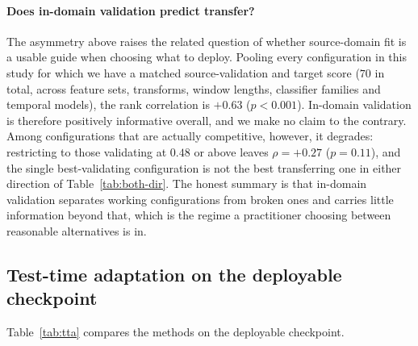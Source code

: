\documentclass[a4paper,fleqn]{cas-dc}
\begin{document}
\paragraph{Does in-domain validation predict transfer?} The asymmetry above raises the
related question of whether source-domain fit is a usable guide when choosing what to
deploy. Pooling every configuration in this study for which we have a matched
source-validation and target score ($70$ in total, across feature sets, transforms,
window lengths, classifier families and temporal models), the rank correlation is
$+0.63$ ($p<0.001$). In-domain validation is therefore positively informative overall,
and we make no claim to the contrary. Among configurations that are actually competitive,
however, it degrades: restricting to those validating at $0.48$ or above leaves
$\rho=+0.27$ ($p=0.11$), and the single best-validating configuration is not the best
transferring one in either direction of Table~\ref{tab:both-dir}. The honest summary is
that in-domain validation separates working configurations from broken ones and carries
little information beyond that, which is the regime a practitioner choosing between
reasonable alternatives is in.

\subsection{Test-time adaptation on the deployable checkpoint}
\label{sec:res-tta}

Table~\ref{tab:tta} compares the methods on the deployable checkpoint.
\end{document}
